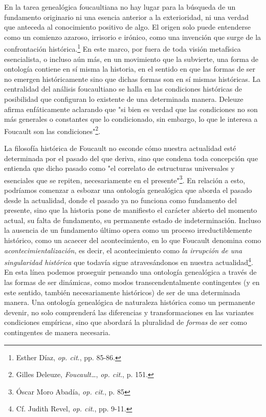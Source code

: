 \documentclass{book}
\begin{document}
En la tarea genealógica foucaultiana no hay lugar para la búsqueda de un
fundamento originario ni una esencia anterior a la exterioridad, ni una
verdad que anteceda al conocimiento positivo de algo. El origen solo
puede entenderse como un comienzo azaroso, irrisorio e irónico, como una
invención que surge de la confrontación histórica.\footnote{Esther Díaz,
  \emph{op. cit}., pp. 85-86.} En este marco, por fuera de toda visión
metafísica esencialista, o incluso aún más, en un movimiento que la
subvierte, una forma de ontología contiene en sí misma la historia, en
el sentido en que las formas de ser no emergen históricamente sino que
dichas formas son en sí mismas históricas. La centralidad del análisis
foucaultiano se halla en las condiciones históricas de posibilidad que
configuran lo existente de una determinada manera. Deleuze afirma
enfáticamente aclarando que "si bien es verdad que las condiciones no
son más generales o constantes que lo condicionado, sin embargo, lo que
le interesa a Foucault son las condiciones"\footnote{Gilles Deleuze,
  \emph{Foucault\ldots{}}, \emph{op. cit}., p. 151.}.

La filosofía histórica de Foucault no esconde cómo nuestra actualidad
esté determinada por el pasado del que deriva, sino que condena toda
concepción que entienda que dicho pasado como "el correlato de
estructuras universales y esenciales que se repiten, necesariamente en
el presente"\footnote{Óscar Moro Abadía, \emph{op. cit}., p. 85}. En
relación a esto, podríamos comenzar a esbozar una ontología genealógica
que aborda el pasado desde la actualidad, donde el pasado ya no funciona
como fundamento del presente, sino que la historia pone de manifiesto el
carácter abierto del momento actual, su falta de fundamento, su
permanente estado de indeterminación. Incluso la ausencia de un
fundamento último opera como un proceso irreductiblemente histórico,
como un acaecer del acontecimiento, en lo que Foucault denomina como
\emph{acontecimientalización}, es decir, el acontecimiento como \emph{la
irrupción de una singularidad histórica} que todavía sigue
atravesándonos en nuestra actualidad\footnote{Cf. Judith Revel,
  \emph{op. cit}., pp. 9-11.}. En esta línea podemos proseguir pensando
una ontología genealógica a través de las formas de ser dinámicas, como
modos transcendentalmente contingentes (y en este sentido, también
necesariamente históricos) de ser de una determinada manera. Una
ontología genealógica de naturaleza histórica como un permanente
devenir, no solo comprenderá las diferencias y transformaciones en las
variantes condiciones empíricas, sino que abordará la pluralidad de
\emph{formas} de ser como contingentes de manera necesaria.
\end{document}
